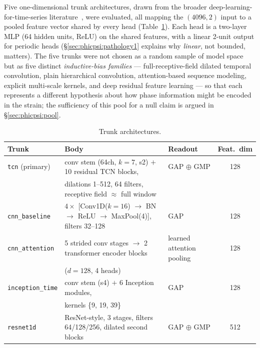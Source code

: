 \documentclass[11pt]{article}
\begin{document}
Five one-dimensional trunk architectures, drawn from the broader deep-learning-for-time-series literature~\citep{ismailfawaz2019deep}, were evaluated, all mapping the $(4096, 2)$ input to a pooled feature vector shared by every head (Table~\ref{tab:phicpsi:trunks}).
Each head is a two-layer MLP (64 hidden units, ReLU) on the shared features, with a linear 2-unit output for periodic heads (\S\ref{sec:phicpsi:pathology1} explains why \emph{linear}, not bounded, matters).
The five trunks were not chosen as a random sample of model space but as five distinct \emph{inductive-bias families} --- full-receptive-field dilated temporal convolution, plain hierarchical convolution, attention-based sequence modeling, explicit multi-scale kernels, and deep residual feature learning --- so that each represents a different hypothesis about how phase information might be encoded in the strain; the sufficiency of this pool for a null claim is argued in \S\ref{sec:phicpsi:pool}.

\begin{table}[tbp]
    \centering
    \caption{Trunk architectures.}
    \label{tab:phicpsi:trunks}
    \small
    \begin{tabular}{@{}lllc@{}}
        \toprule
        Trunk                    & Body                                                                      & Readout           & Feat.\ dim \\
        \midrule
        \texttt{tcn} (primary)   & conv stem (64ch, $k{=}7$, s2) $+$ 10 residual TCN blocks, & GAP $\oplus$ GMP & 128 \\
        & dilations 1--512, 64 filters, receptive field $\approx$ full window~\citep{bai2018tcn} &                   &            \\
        \texttt{cnn\_baseline}   & $4\times$ [Conv1D($k{=}16$) $\to$ BN $\to$ ReLU $\to$ MaxPool(4)], filters 32--128 & GAP & 128 \\
        \texttt{cnn\_attention}  & 5 strided conv stages $\to$ 2 transformer encoder blocks                  & learned attention pooling & 128 \\
        & ($d{=}128$, 4 heads)~\citep{vaswani2017attention}                          &                   &            \\
        \texttt{inception\_time} & conv stem (s4) $+$ 6 Inception modules,                                   & GAP               & 128        \\
        & kernels \{9, 19, 39\}~\citep{fawaz2019inceptiontime}                       &                   &            \\
        \texttt{resnet1d}        & ResNet-style, 3 stages, filters 64/128/256, dilated second blocks~\citep{he2016resnet} & GAP $\oplus$ GMP & 512 \\
        \bottomrule
    \end{tabular}
\end{table}
\end{document}
